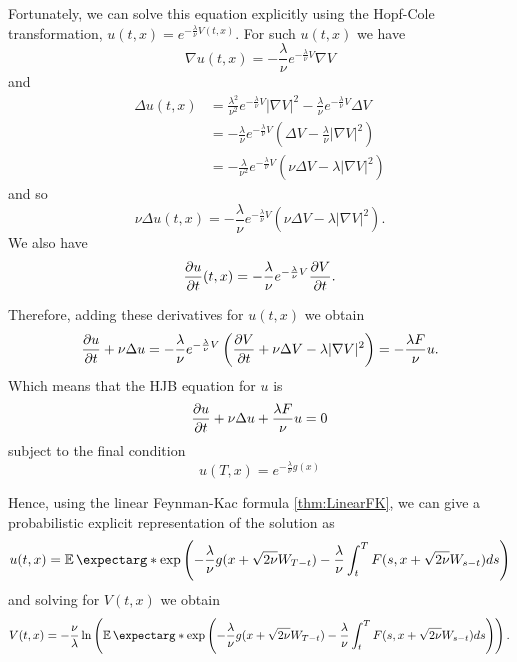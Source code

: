 Fortunately, we can solve this equation explicitly using the Hopf-Cole transformation, $u(t,x)= e^{-\frac{\lambda}{\nu} V(t,x)}$. For such $u(t,x)$ we have
\begin{equation}
	\nabla u(t,x)=-\frac{\lambda}{\nu} e^{-\frac{\lambda}{\nu} V}\nabla V
\end{equation}
and
\begin{equation}
	\begin{split}
		\Delta u(t,x)&=\frac{\lambda^2}{\nu^2} e^{-\frac{\lambda}{\nu} V}|\nabla V|^2-\frac{\lambda}{\nu} e^{-\frac{\lambda}{\nu} V}\Delta V \\
		&=-\frac{\lambda}{\nu} e^{-\frac{\lambda}{\nu} V}\left(\Delta V - \frac{\lambda}{\nu} |\nabla V|^2 \right)\\
		&=-\frac{\lambda}{\nu^2} e^{-\frac{\lambda}{\nu} V}\left(\nu\Delta V - \lambda |\nabla V|^2 \right)
	\end{split}
\end{equation}
and so
\begin{equation}
	\nu \Delta u(t,x)=-\frac{\lambda}{\nu} e^{-\frac{\lambda}{\nu} V}\left(\nu\Delta V - \lambda |\nabla V|^2 \right).
\end{equation}
We also have
\begin{equation}
	\frac{\partial u}{\partial t}(t,x)=-\frac{\lambda}{\nu} e^{-\frac{\lambda}{\nu} V} \frac{\partial V}{\partial t}.
\end{equation}

Therefore, adding these derivatives for $u(t,x)$ we obtain 
\begin{equation}
	\frac{\partial u}{\partial t}+\nu\Delta u=-\frac{\lambda}{\nu}e^{-\frac{\lambda}{\nu} V}\left(\frac{\partial V}{\partial t}+\nu \Delta V -\lambda |\nabla V|^2\right)=-\frac{\lambda F}{\nu}u.
\end{equation}
Which means that the HJB equation for $u$ is 
\begin{equation}
	\frac{\partial u}{\partial t}+\nu \Delta u+\frac{\lambda F}{\nu}u=0
\end{equation}
subject to the final condition 
\begin{equation}
	u(T,x)=e^{-\frac{\lambda}{\nu} g(x)}
\end{equation}

Hence, using the linear Feynman-Kac formula \ref{thm:LinearFK}, we can give a probabilistic explicit representation of the solution as
\begin{equation}
	u(t,x)=\expect*{\exp\left(-\frac{\lambda}{\nu} g(x+\sqrt{2\nu}W_{T-t})-\frac{\lambda}{\nu}\int_{t}^{T}F(s,x+\sqrt{2\nu}W_{s-t})ds\right)}
\end{equation}
and solving for $V(t,x)$ we obtain
\begin{equation}
	V(t,x)=-\frac{\nu}{\lambda}\ln\left(\expect*{\exp \left(-\frac{\lambda}{\nu} g(x+\sqrt{2\nu}W_{T-t})-\frac{\lambda}{\nu}\int_{t}^{T}F(s,x+\sqrt{2\nu}W_{s-t})ds\right)}\right).
\end{equation}